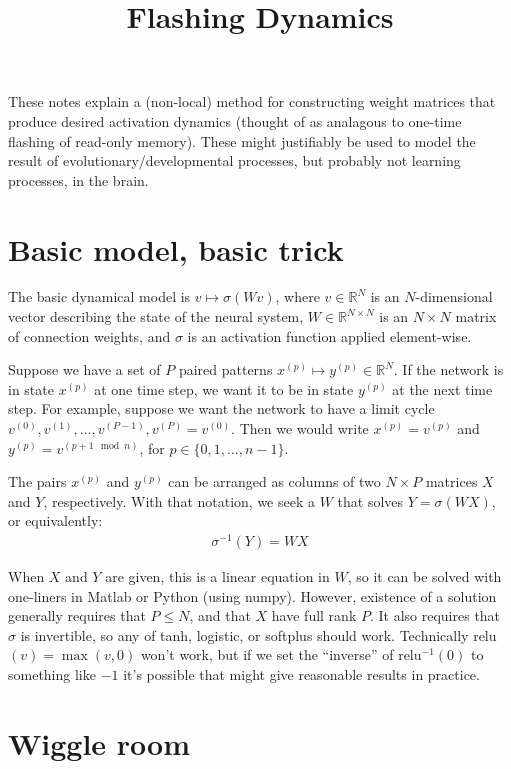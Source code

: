 \documentclass[pdftex,12pt,letterpaper]{article}
\begin{document}
\title{Flashing Dynamics}
\date{}
\maketitle

These notes explain a (non-local) method for constructing weight matrices that produce desired activation dynamics (thought of as analagous to one-time flashing of read-only memory).  These might justifiably be used to model the result of evolutionary/developmental processes, but probably not learning processes, in the brain.

\section{Basic model, basic trick}

The basic dynamical model is $v \mapsto \sigma(Wv)$, where $v\in\mathbb{R}^N$ is an $N$-dimensional vector describing the state of the neural system, $W\in\mathbb{R}^{N\times N}$ is an $N\times N$ matrix of connection weights, and $\sigma$ is an activation function applied element-wise.

Suppose we have a set of $P$ paired patterns $x^{(p)}\mapsto y^{(p)}\in\mathbb{R}^N$.  If the network is in state $x^{(p)}$ at one time step, we want it to be in state $y^{(p)}$ at the next time step.  For example, suppose we want the network to have a limit cycle $v^{(0)}, v^{(1)}, ..., v^{(P-1)}, v^{(P)} = v^{(0)}$.  Then we would write $x^{(p)} = v^{(p)}$ and $y^{(p)} = v^{(p+1 \mod n)}$, for $p\in\{0,1,...,n-1\}$.

The pairs $x^{(p)}$ and $y^{(p)}$ can be arranged as columns of two $N\times P$ matrices $X$ and $Y$, respectively.  With that notation, we seek a $W$ that solves $Y = \sigma(WX)$, or equivalently:
\begin{align}
\sigma^{-1}(Y) = WX\label{eq:cons}
\end{align}

When $X$ and $Y$ are given, this is a linear equation in $W$, so it can be solved with one-liners in Matlab or Python (using numpy).  However, existence of a solution generally requires that $P\leq N$, and that $X$ have full rank $P$.  It also requires that $\sigma$ is invertible, so any of tanh, logistic, or softplus should work.  Technically relu$(v) = \max(v,0)$ won't work, but if we set the ``inverse'' of relu$^{-1}(0)$ to something like $-1$ it's possible that might give reasonable results in practice.

\section{Wiggle room}
\end{document}
